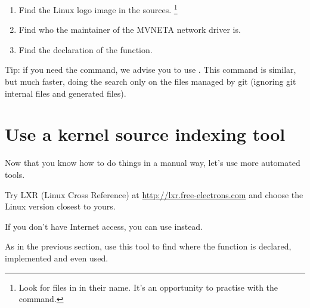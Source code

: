 \begin{enumerate}
\item Find the Linux logo image in the sources.
      \footnote{Look for files in  in their name. It's an
      opportunity to practise with the  command.}
\item Find who the maintainer of the MVNETA network driver is.
\item Find the declaration of the  function.
\end{enumerate}

Tip: if you need the  command, we advise you to use . This command is similar, but much faster, doing the search only
on the files managed by git (ignoring git internal files and generated
files).

\section{Use a kernel source indexing tool}

Now that you know how to do things in a manual way, let's use more
automated tools.

Try LXR (Linux Cross Reference) at \url{http://lxr.free-electrons.com}
and choose the Linux version closest to yours.

If you don't have Internet access, you can use  instead.

As in the previous section, use this tool to find where
the  function is declared, implemented and
even used.
